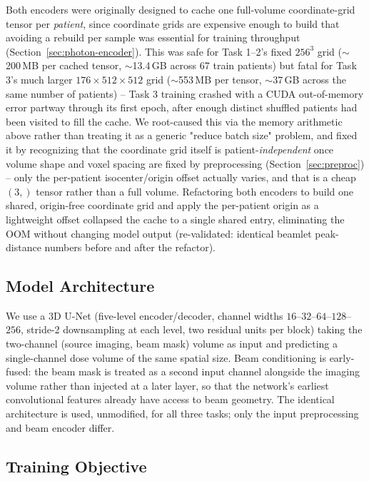 \documentclass[10pt,conference]{IEEEtran}
\begin{document}
Both encoders were originally designed to cache one full-volume
coordinate-grid tensor per \emph{patient}, since coordinate grids are
expensive enough to build that avoiding a rebuild per sample was
essential for training throughput (Section~\ref{sec:photon-encoder}).
This was safe for Task 1--2's fixed $256^3$ grid ($\sim$200\,MB per
cached tensor, $\sim$13.4\,GB across 67 train patients) but fatal for
Task 3's much larger $176\times512\times512$ grid ($\sim$553\,MB per
tensor, $\sim$37\,GB across the same number of patients) -- Task 3
training crashed with a CUDA out-of-memory error partway through its
first epoch, after enough distinct shuffled patients had been visited to
fill the cache. We root-caused this via the memory arithmetic above
rather than treating it as a generic "reduce batch size" problem, and
fixed it by recognizing that the coordinate grid itself is
patient-\emph{independent} once volume shape and voxel spacing are
fixed by preprocessing (Section~\ref{sec:preproc}) -- only the
per-patient isocenter/origin offset actually varies, and that is a
cheap $(3,)$ tensor rather than a full volume. Refactoring both encoders
to build one shared, origin-free coordinate grid and apply the
per-patient origin as a lightweight offset collapsed the cache to a
single shared entry, eliminating the OOM without changing model output
(re-validated: identical beamlet peak-distance numbers before and after
the refactor).

\subsection{Model Architecture}

We use a 3D U-Net (five-level encoder/decoder, channel widths
$16$--$32$--$64$--$128$--$256$, stride-2 downsampling at each level, two
residual units per block) taking the two-channel (source imaging, beam
mask) volume as input and predicting a single-channel dose volume of the
same spatial size. Beam conditioning is early-fused: the beam mask is
treated as a second input channel alongside the imaging volume rather
than injected at a later layer, so that the network's earliest
convolutional features already have access to beam geometry. The
identical architecture is used, unmodified, for all three tasks; only
the input preprocessing and beam encoder differ.

\subsection{Training Objective}
\label{sec:loss}
\end{document}
